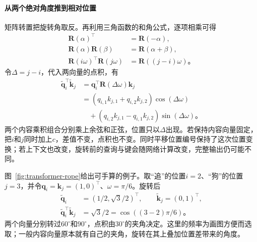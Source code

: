 \paragraph{从两个绝对角度推到相对位置}
矩阵转置把旋转角取反。再利用三角函数的和角公式，逐项相乘可得
\begin{equation}
  \begin{aligned}
    \bm R(\alpha)^{\top}&=\bm R(-\alpha),\\
    \bm R(\alpha)\bm R(\beta)&=\bm R(\alpha+\beta),\\
    \bm R(i\omega)^{\top}\bm R(j\omega)
      &=\bm R((j-i)\omega)\text{。}
  \end{aligned}
  \label{eq:transformer-rope-composition}
\end{equation}
令$\Delta=j-i$，代入两向量的点积，有
\begin{equation}
  \begin{aligned}
    \widetilde{\bm q}_i^{\top}\widetilde{\bm k}_j
      &=\bm q_i^{\top}\bm R(\Delta\omega)\bm k_j\\
      &=(q_{i,1}k_{j,1}+q_{i,2}k_{j,2})\cos(\Delta\omega)\\
      &\quad +(q_{i,2}k_{j,1}-q_{i,1}k_{j,2})\sin(\Delta\omega)\text{。}
  \end{aligned}
  \label{eq:transformer-rope-two-dimensional}
\end{equation}
两个内容乘积组合分别乘上余弦和正弦，位置只以$\Delta$出现。若保持内容向量固定，把$i$和$j$同时加上$c$，差值不变，点积也不变。同时平移位置编号保持了这次位置变换；若上下文也改变，旋转前的查询与键会随网络计算改变，完整输出仍可能不同。

图~\ref{fig:transformer-rope}给出可手算的例子。取“追”的位置$i=2$、“狗”的位置$j=3$，并令$\bm q_i=\bm k_j=(1,0)^{\top}$、$\omega=\pi/6$。旋转后
\[
  \begin{aligned}
    \widetilde{\bm q}_i&=(1/2,\sqrt3/2)^{\top},\qquad
    \widetilde{\bm k}_j=(0,1)^{\top},\\
    \widetilde{\bm q}_i^{\top}\widetilde{\bm k}_j
      &=\sqrt3/2=\cos((3-2)\pi/6)\text{。}
  \end{aligned}
\]
两个向量分别转过$60^\circ$和$90^\circ$，点积由$30^\circ$的夹角决定。这里的频率为画图方便而选取；一般内容向量原本就有自己的夹角，旋转在其上叠加位置差带来的角度。

